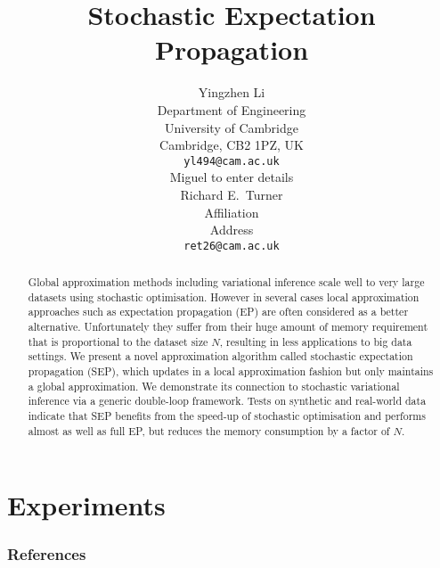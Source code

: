 \documentclass{article} %
\title{Stochastic Expectation Propagation}
\author{
Yingzhen Li \\
Department of Engineering\\
University of Cambridge\\
Cambridge, CB2 1PZ, UK \\
\texttt{yl494@cam.ac.uk} \\
\And
Miguel to enter details\\
\And
Richard E.~Turner \\
Affiliation \\
Address \\
\texttt{ret26@cam.ac.uk} \\
}
\begin{document}
\maketitle

\begin{abstract}
Global approximation methods including variational inference scale well to very large datasets using stochastic optimisation. However in several cases local approximation approaches such as expectation propagation (EP) are often considered as a better alternative. Unfortunately they suffer from their huge amount of memory requirement that is proportional to the dataset size $N$, resulting in less applications to big data settings. We present a novel approximation algorithm called stochastic expectation propagation (SEP), which updates in a local approximation fashion but only maintains a global approximation. We demonstrate its connection to stochastic variational inference via a generic double-loop framework. Tests on synthetic and real-world data indicate that SEP benefits from the speed-up of stochastic optimisation and performs almost as well as full EP, but reduces the memory consumption by a factor of $N$. 
\end{abstract}


%

%

%



\section{Experiments}






\subsubsection*{References}
\renewcommand{\section}[2]{}


\end{document}
